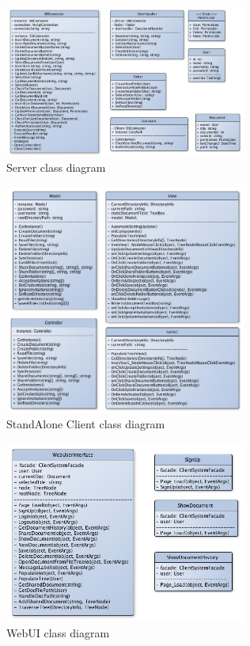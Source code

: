 \documentclass[11pt,a4paper]{article}
\begin{document}
\begin{figure}[H]
  		\centering
    	\includegraphics[width=300px]{images/ServerClassDiagram2of2.jpg}
    	\caption{Server class diagram}
\end{figure}

\begin{figure}[H]
  		\centering
    	\includegraphics[width=300px]{images/StandAloneClient_CompleteClassDiagram.jpg}
    	\caption{StandAlone Client class diagram}
\end{figure}

\begin{figure}[H]
  		\centering
    	\includegraphics[width=300px]{images/WebUICompleteClassDiagram.jpg}
    	\caption{WebUI class diagram}
\end{figure}
\end{document}
